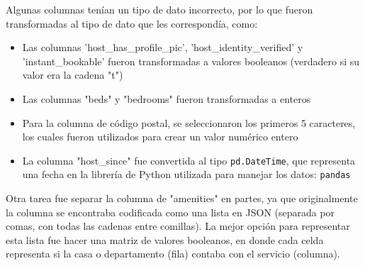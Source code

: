 \documentclass[sigconf,authorversion,nonacm]{acmart}
\begin{document}
Algunas columnas tenían un tipo de dato incorrecto, por lo que fueron transformadas al tipo de dato que les correspondía, como:
\begin{itemize}
  \item Las columnas 'host\_has\_profile\_pic', 'host\_identity\_verified' y 'instant\_bookable' fueron transformadas a valores booleanos (verdadero si su valor era la cadena "t")
  \item Las columnas "beds" y "bedrooms" fueron transformadas a enteros
  \item Para la columna de código postal, se seleccionaron los primeros 5 caracteres, los cuales fueron utilizados para crear un valor numérico entero
  \item La columna "host\_since" fue convertida al tipo \texttt{pd.DateTime}, que representa una fecha en la librería de Python utilizada para manejar los datos: \texttt{pandas}
\end{itemize}

Otra tarea fue separar la columna de "amenities" en partes, ya que originalmente la columna se encontraba codificada como una lista en JSON (separada por comas, con todas las cadenas entre comillas). La mejor opción para representar esta lista fue hacer una matriz de valores booleanos, en donde cada celda representa si la casa o departamento (fila) contaba con el servicio (columna).
\end{document}
